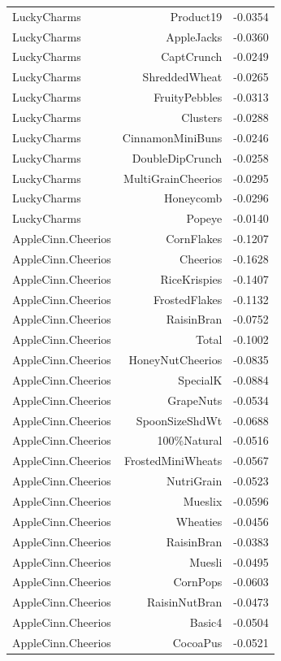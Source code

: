 \begin{longtable}{@{}lrr@{}}
LuckyCharms & Product19 & -0.0354 \\
LuckyCharms & AppleJacks & -0.0360 \\
LuckyCharms & CaptCrunch & -0.0249 \\
LuckyCharms & ShreddedWheat & -0.0265 \\
LuckyCharms & FruityPebbles & -0.0313 \\
LuckyCharms & Clusters & -0.0288 \\
LuckyCharms & CinnamonMiniBuns & -0.0246 \\
LuckyCharms & DoubleDipCrunch & -0.0258 \\
LuckyCharms & MultiGrainCheerios & -0.0295 \\
LuckyCharms & Honeycomb & -0.0296 \\
LuckyCharms & Popeye & -0.0140 \\
AppleCinn.Cheerios & CornFlakes & -0.1207 \\
AppleCinn.Cheerios & Cheerios & -0.1628 \\
AppleCinn.Cheerios & RiceKrispies & -0.1407 \\
AppleCinn.Cheerios & FrostedFlakes & -0.1132 \\
AppleCinn.Cheerios & RaisinBran & -0.0752 \\
AppleCinn.Cheerios & Total & -0.1002 \\
AppleCinn.Cheerios & HoneyNutCheerios & -0.0835 \\
AppleCinn.Cheerios & SpecialK & -0.0884 \\
AppleCinn.Cheerios & GrapeNuts & -0.0534 \\
AppleCinn.Cheerios & SpoonSizeShdWt & -0.0688 \\
AppleCinn.Cheerios & 100\%Natural & -0.0516 \\
AppleCinn.Cheerios & FrostedMiniWheats & -0.0567 \\
AppleCinn.Cheerios & NutriGrain & -0.0523 \\
AppleCinn.Cheerios & Mueslix & -0.0596 \\
AppleCinn.Cheerios & Wheaties & -0.0456 \\
AppleCinn.Cheerios & RaisinBran & -0.0383 \\
AppleCinn.Cheerios & Muesli & -0.0495 \\
AppleCinn.Cheerios & CornPops & -0.0603 \\
AppleCinn.Cheerios & RaisinNutBran & -0.0473 \\
AppleCinn.Cheerios & Basic4 & -0.0504 \\
AppleCinn.Cheerios & CocoaPus & -0.0521 \\

\end{longtable}
